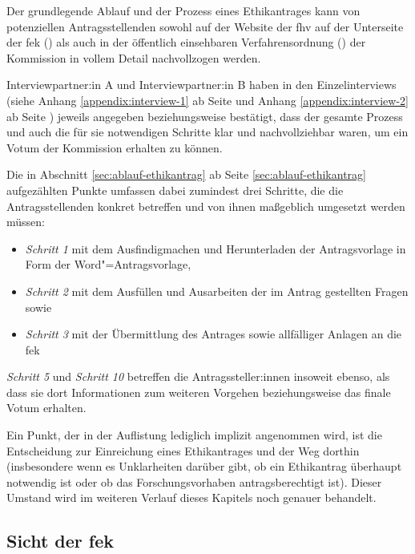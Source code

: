 \documentclass[a4paper,12pt,twoside]{scrreprt}
\begin{document}
Der grundlegende Ablauf und der Prozess eines Ethikantrages kann von potenziellen Antragsstellenden sowohl auf der Website der \ac{fhv} auf der Unterseite der \ac{fek} (\cite{fachhochschule_vorarlberg_gmbh_forschungsethik-kommission_2021}) als auch in der öffentlich einsehbaren Verfahrensordnung (\cite{forschungsethik-kommission_der_fachhochschule_vorarlberg_verfahrensordnung_2020}) der Kommission in vollem Detail nachvollzogen werden.

Interviewpartner:in A und Interviewpartner:in B haben in den Einzelinterviews (siehe Anhang \ref{appendix:interview-1} ab Seite \pageref{appendix:interview-1} und Anhang \ref{appendix:interview-2} ab Seite \pageref{appendix:interview-2}) jeweils angegeben beziehungsweise bestätigt, dass der gesamte Prozess und auch die für sie notwendigen Schritte klar und nachvollziehbar waren, um ein Votum der Kommission erhalten zu können.

\medskip

Die in Abschnitt \ref{sec:ablauf-ethikantrag} ab Seite \ref{sec:ablauf-ethikantrag} aufgezählten Punkte umfassen dabei zumindest drei Schritte, die die Antragsstellenden konkret betreffen und von ihnen maßgeblich umgesetzt werden müssen:
\begin{itemize}
    \item \textit{Schritt 1} mit dem Ausfindigmachen und Herunterladen der Antragsvorlage in Form der Word"=Antragsvorlage,
    \item \textit{Schritt 2} mit dem Ausfüllen und Ausarbeiten der im Antrag gestellten Fragen sowie
    \item \textit{Schritt 3} mit der Übermittlung des Antrages sowie allfälliger Anlagen an die \ac{fek}
\end{itemize}

\noindent\textit{Schritt 5} und \textit{Schritt 10} betreffen die Antragssteller:innen insoweit ebenso, als dass sie dort Informationen zum weiteren Vorgehen beziehungsweise das finale Votum erhalten.

Ein Punkt, der in der Auflistung lediglich implizit angenommen wird, ist die Entscheidung zur Einreichung eines Ethikantrages und der Weg dorthin (insbesondere wenn es Unklarheiten darüber gibt, ob ein Ethikantrag überhaupt notwendig ist oder ob das Forschungsvorhaben antragsberechtigt ist). Dieser Umstand wird im weiteren Verlauf dieses Kapitels noch genauer behandelt.

\subsection{Sicht der \acl{fek}}
\label{sub-sec:ablauf-sicht-fek}
\end{document}
